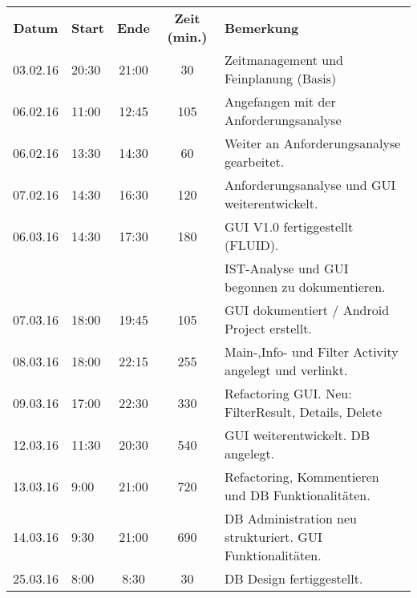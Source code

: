 \begin{tabular}{|c|l|c|c|l|}
	\rowcolor{black} {\color{white}\textbf{Datum}} & {\color{white}\textbf{Start}} & {\color{white}\textbf{Ende}} & {\color{white}\textbf{Zeit (min.)}} & {\color{white}\textbf{Bemerkung}} \\
	03.02.16 & 20:30 & 21:00 & 30 & Zeitmanagement und Feinplanung (Basis) \\ \hline
	\rowcolor{DarkSeaGreen} 06.02.16 & 11:00 & 12:45 & 105 & Angefangen mit der Anforderungsanalyse \\ \hline
	06.02.16 & 13:30 & 14:30 & 60 & Weiter an Anforderungsanalyse gearbeitet. \\ \hline
	\rowcolor{DarkSeaGreen} 07.02.16 & 14:30 & 16:30 & 120 & Anforderungsanalyse und GUI weiterentwickelt. \\ \hline
	06.03.16 & 14:30 & 17:30 & 180 & GUI V1.0 fertiggestellt (FLUID). \\ \hline
	\rowcolor{DarkSeaGreen} & & & & IST-Analyse und GUI begonnen zu dokumentieren. \\ \hline
	07.03.16 & 18:00 & 19:45 & 105 & GUI dokumentiert / Android Project erstellt. \\ \hline
	\rowcolor{DarkSeaGreen} 08.03.16 & 18:00 & 22:15 & 255 & Main-,Info- und Filter Activity angelegt und verlinkt. \\ \hline
	09.03.16 & 17:00 & 22:30 & 330 & Refactoring GUI. Neu: FilterResult, Details, Delete\\ \hline
	\rowcolor{DarkSeaGreen} 12.03.16 & 11:30 & 20:30 & 540 & GUI weiterentwickelt. DB angelegt. \\ \hline
	13.03.16 & 9:00 & 21:00 & 720 & Refactoring, Kommentieren und DB Funktionalitäten.\\ \hline
	\rowcolor{DarkSeaGreen} 14.03.16 & 9:30 & 21:00 & 690 & DB Administration neu strukturiert. GUI Funktionalitäten.\\ \hline
	25.03.16 & 8:00 & 8:30 & 30 & DB Design fertiggestellt. \\ \hline
\end{tabular}